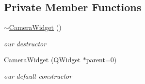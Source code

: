 \subsection*{Private Member Functions}
\begin{DoxyCompactItemize}
\item 
\hypertarget{class_camera_widget_ac8ceae1653382675b396ec01a376d124}{\hyperlink{class_camera_widget_ac8ceae1653382675b396ec01a376d124}{$\sim$\-Camera\-Widget} ()}\label{class_camera_widget_ac8ceae1653382675b396ec01a376d124}

\begin{DoxyCompactList}\small\item\em our destructor \end{DoxyCompactList}\item 
\hypertarget{class_camera_widget_a637ffd88fb213dad01dfa7294248029e}{\hyperlink{class_camera_widget_a637ffd88fb213dad01dfa7294248029e}{Camera\-Widget} (Q\-Widget $\ast$parent=0)}\label{class_camera_widget_a637ffd88fb213dad01dfa7294248029e}

\begin{DoxyCompactList}\small\item\em our default constructor \end{DoxyCompactList}\end{DoxyCompactItemize}
